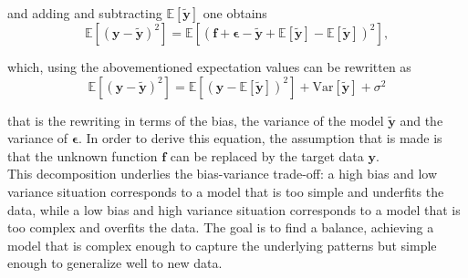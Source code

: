 \documentclass[
 reprint,            %
 amsmath,amssymb,
 aps,
]{revtex4-2}
\begin{document}
and adding and subtracting $\mathbb{E}\left[\boldsymbol{\tilde{y}}\right]$ one obtains 
$$
\mathbb{E}\left[(\boldsymbol{y}-\boldsymbol{\tilde{y}})^2\right]=\mathbb{E}\left[(\boldsymbol{f}+\boldsymbol{\epsilon}-\boldsymbol{\tilde{y}}+\mathbb{E}\left[\boldsymbol{\tilde{y}}\right]-\mathbb{E}\left[\boldsymbol{\tilde{y}}\right])^2\right],
$$

which, using the abovementioned expectation values can be rewritten as
\begin{equation}
    \label{eq: bias-var-...}
\mathbb{E}\left[(\boldsymbol{y}-\boldsymbol{\tilde{y}})^2\right]=\mathbb{E}\left[(\boldsymbol{y}-\mathbb{E}\left[\boldsymbol{\tilde{y}}\right])^2\right]+\mathrm{Var}\left[\boldsymbol{\tilde{y}}\right]+\sigma^2
\end{equation}


that is the rewriting in terms of the bias, the variance of the model $\boldsymbol{\tilde{y}}$ and the variance of $\boldsymbol{\epsilon}$. 
In order to derive this equation, the assumption that is made is that the unknown function $\boldsymbol{f}$ can be replaced by the target data $\boldsymbol{y}$.\\
This decomposition underlies the bias-variance trade-off: a high bias and low variance situation corresponds to a model that is too simple and underfits the data, while a low bias and high variance situation corresponds to a model that is too complex and overfits the data.
The goal is to find a balance, achieving a model that is complex enough to capture the underlying patterns but simple enough to generalize well to new data.\\\\
\end{document}
